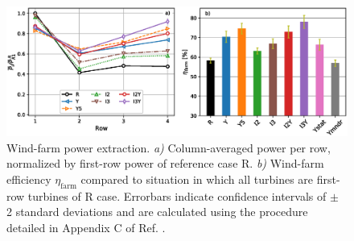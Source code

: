 \documentclass[energies,article,submit,moreauthors,latex,10pt,a4paper]{mdpi}
\begin{document}
\begin{figure}
	\includegraphics[width=\textwidth]{figure12}
	\caption{Wind-farm power extraction. \emph{a) } Column-averaged power per row, normalized by first-row power of reference case R. \emph{b) } Wind-farm efficiency $\eta_{\text{farm}}$ compared to situation in which all turbines are first-row turbines of R case. Errorbars indicate confidence intervals of $\pm$ 2 standard deviations and are calculated using the procedure detailed in Appendix C of Ref. \cite{munters2017optimal}. \label{fig:power_turb}}
\end{figure}
\end{document}
